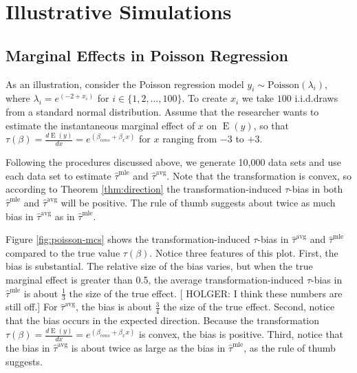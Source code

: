 \documentclass[11pt]{article}
\DeclareMathOperator*{\E}{\text{E}}
\begin{document}
\section*{Illustrative Simulations}

\subsection*{Marginal Effects in Poisson Regression}

As an illustration, consider the Poisson regression model $y_i \sim \text{Poisson}(\lambda_i)$, where $\lambda_i = e^{(-2 + x_i)}$ for $i \in \{1, 2,\ldots, 100\}$. To create $x_i$ we take $100$ i.i.d.\@ draws from a standard normal distribution. Assume that the researcher wants to estimate the instantaneous marginal effect of $x$ on $\E(y)$, so that $\tau(\beta) = \frac{d \E (y)}{dx} = e^{(\beta_{cons} + \beta_x x)}$ for $x$ ranging from $-3$ to $+3$.

Following the procedures discussed above, we generate 10,000 data sets and use each data set to estimate $\hat{\tau}^\text{mle}$ and $\hat{\tau}^\text{avg}$.
Note that the transformation is convex, so according to Theorem \ref{thm:direction} the transformation-induced $\tau$-bias in both $\hat{\tau}^\text{mle}$ and $\hat{\tau}^\text{avg}$ will be positive.
The rule of thumb suggests about twice as much bias in $\hat{\tau}^\text{avg}$ as in $\hat{\tau}^\text{mle}$.

Figure \ref{fig:poisson-mcs} shows the transformation-induced $\tau$-bias in $\hat{\tau}^\text{avg}$ and $\hat{\tau}^\text{mle}$ compared to the true value $\tau(\beta)$. Notice three features of this plot. First, the bias is substantial. The relative size of the bias varies, but when the true marginal effect is greater than 0.5, the average transformation-induced $\tau$-bias in $\hat{\tau}^\text{mle}$ is about $\frac{1}{3}$ the size of the true effect. [{\color{red} HOLGER: I think these numbers are still off.}] For $\hat{\tau}^\text{avg}$, the bias is about $\frac{3}{4}$ the size of the true effect. Second, notice that the bias occurs in the expected direction. Because the transformation $\tau(\beta) = \frac{d \E (y)}{dx} = e^{(\beta_{cons} + \beta_x x)}$ is convex, the bias is positive. Third, notice that the bias in $\hat{\tau}^\text{avg}$ is about twice as large as the bias in $\hat{\tau}^\text{mle}$, as the rule of thumb suggests.
\end{document}
